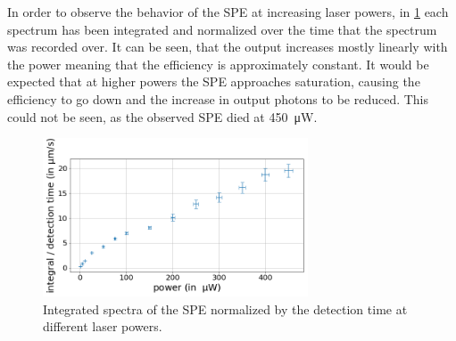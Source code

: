 In order to observe the behavior of the SPE at increasing laser powers, in \cref{fig_spe_integrals} each spectrum has been integrated and normalized over the time that the spectrum was recorded over. %
It can be seen, that the output increases mostly linearly with the power meaning that the efficiency is approximately constant.
It would be expected that at higher powers the SPE approaches saturation, causing the efficiency to go down and the increase in output photons to be reduced.
This could not be seen, as the observed SPE died at \SI{450}{\micro W}.

\begin{figure}[H]
    \centering
    \includegraphics[width=0.7\textwidth]{img/output_t2/integrals.png}
    \caption{Integrated spectra of the SPE normalized by the detection time at different laser powers.}
    \label{fig_spe_integrals}
\end{figure}
